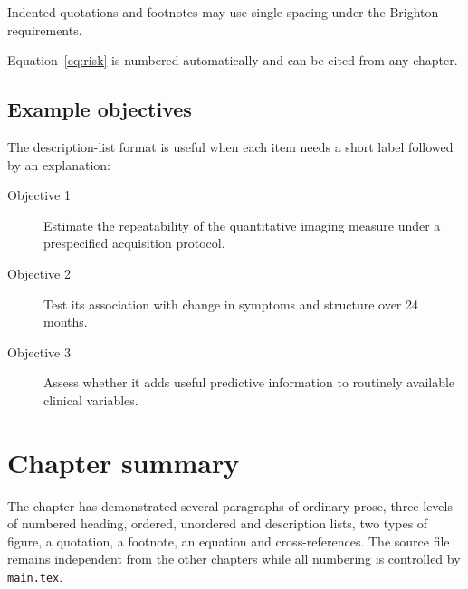 \begin{brightonquotation}
Indented quotations and footnotes may use single spacing under the Brighton
requirements.
\end{brightonquotation}

Equation~\ref{eq:risk} is numbered automatically and can be cited from any
chapter.

\subsection{Example objectives}
The description-list format is useful when each item needs a short label
followed by an explanation:

\begin{description}
  \item[Objective 1] Estimate the repeatability of the quantitative imaging
    measure under a prespecified acquisition protocol.
  \item[Objective 2] Test its association with change in symptoms and structure
    over 24 months.
  \item[Objective 3] Assess whether it adds useful predictive information to
    routinely available clinical variables.
\end{description}

\section{Chapter summary}
The chapter has demonstrated several paragraphs of ordinary prose, three levels
of numbered heading, ordered, unordered and description lists, two types of
figure, a quotation, a footnote, an equation and cross-references. The source
file remains independent from the other chapters while all numbering is
controlled by \texttt{main.tex}.
